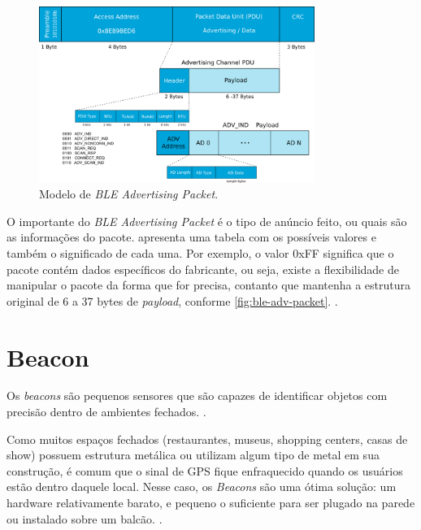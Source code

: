 \begin{figure}[htb]
	\caption{\label{fig:ble-adv-packet}Modelo de \textit{BLE Advertising Packet}.}
	\begin{center}
		\includegraphics[width=0.8\textwidth]{img/ble-adv-packet.png}
	\end{center}
\end{figure}

O importante do \textit{BLE Advertising Packet} é o tipo de anúncio feito, ou quais são as informações do pacote.  apresenta uma tabela com os possíveis valores e também o significado de cada uma. Por exemplo, o valor 0xFF significa que o pacote contém dados específicos do fabricante, ou seja, existe a flexibilidade de manipular o pacote da forma que for precisa, contanto que mantenha a estrutura original de 6 a 37 bytes de \textit{payload}, conforme \autoref{fig:ble-adv-packet}. \cite{ble-packets}.

\section{Beacon}\label{sec:beacon}

Os \textit{beacons} são pequenos sensores que são capazes de identificar objetos com precisão dentro de ambientes fechados. \cite{teixeira-beacon}.

\begin{citacao}
Como muitos espaços fechados (restaurantes, museus, shopping centers, casas de show) possuem estrutura metálica ou utilizam algum tipo de metal em sua construção, é comum que o sinal de GPS fique enfraquecido quando os usuários estão dentro daquele local. Nesse caso, os \textit{Beacons} são uma ótima solução: um hardware relativamente barato, e pequeno o suficiente para ser plugado na parede ou instalado sobre um balcão. \cite{teixeira-beacon}.
\end{citacao}

